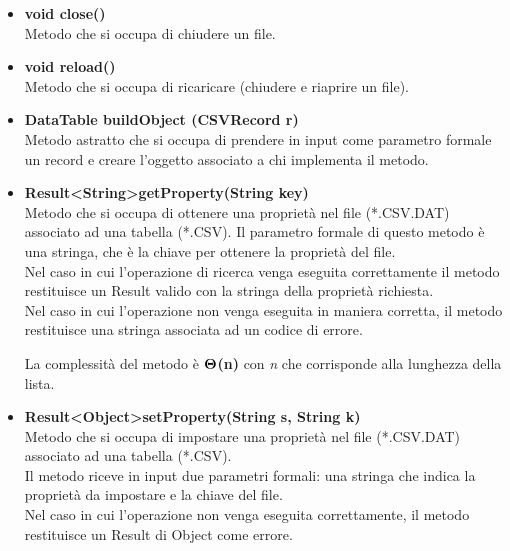 \documentclass[a4paper, 12pt]{scrreprt}
\begin{document}
			\begin{itemize}
				\item \textbf{void close()}
				\\Metodo che si occupa di chiudere un file.
				\item \textbf{void reload()}
				\\Metodo che si occupa di ricaricare (chiudere e riaprire un file).

				\item \textbf {DataTable buildObject (CSVRecord r)}
				\\Metodo astratto che si occupa di prendere in input come parametro formale un record e creare l'oggetto associato a chi implementa il metodo.

				\item \textbf{Result\textless String\textgreater getProperty(String key)}
				\\Metodo che si occupa di ottenere una propriet\`a nel file (*.CSV.DAT) associato ad una tabella (*.CSV). Il parametro formale di questo metodo \`e una stringa, che \`e la chiave per ottenere la propriet\`a del file.
				\\Nel caso in cui l'operazione di ricerca venga eseguita correttamente il metodo restituisce un Result valido con la stringa della propriet\`a richiesta.
				\\Nel caso in cui l'operazione non venga eseguita in maniera corretta, il metodo restituisce una stringa associata ad un codice di errore.
				
				La complessit\`a del metodo \`e $\mathbf{\Theta}$\textbf{(n)} con \textit{n} che corrisponde alla lunghezza della lista.

				\item  \textbf{Result\textless Object\textgreater setProperty(String s, String k)}
				\\Metodo che si occupa di impostare una propriet\`a nel file (*.CSV.DAT) associato ad una tabella (*.CSV).
				\\Il metodo riceve in input due parametri formali: una stringa che indica la propriet\`a da impostare e la chiave del file.
				\\Nel caso in cui l'operazione non venga eseguita correttamente, il metodo restituisce un Result di Object come errore.
			\end{itemize}
\end{document}

